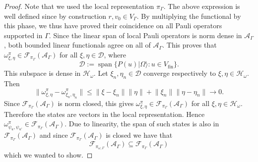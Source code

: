 \documentclass[aps,pra,reprint,superscriptaddress]{revtex4-2}
\newcommand{\cA}{{\mathcal A}}
\newcommand{\cD}{{\mathcal D}}
\newcommand{\cF}{{\mathcal F}}
\newcommand{\cH}{{\mathcal H}}
\newcommand\G{\Gamma}
\newcommand\w{\omega}
\newcommand\W{\Omega}
\newcommand\y{\psi}
\providecommand{\ket}[1]{\lvert #1\rangle}
\providecommand{\norm}[1]{\lVert #1\rVert}
\theoremstyle{definition}
\theoremstyle{remark}
\begin{document}
\begin{proof}
        Note that we used the local representation $\pi_\G$. The above
        expression is well defined since by construction $r,v_0 \in V_\G$.
        By multiplying the functional by this phase, we thus have proved
        their coincidence on all Pauli operators supported in $\G$. 
        Since the linear span of local Pauli operators is norm dense in $\cA_\G$, both bounded linear functionals agree on all of $\cA_\G$. This proves that
        $\w^\pi_{\xi,\eta}\in\cF_{\pi_\G}(\cA_\G)$ for all
        $\xi,\eta\in\cD$, where
        \begin{equation}
            \cD:=\operatorname{span}\{P(u)\ket{\W}:u\in V_{\mathrm{fin}}\}.
        \end{equation}
        This subspace is dense in $\cH_\w$. Let
        $\xi_n,\eta_n\in\cD$ converge respectively to
        $\xi,\eta\in\cH_\w$. Then
        \begin{equation}
            \norm{\w^\pi_{\xi,\eta}-\w^\pi_{\xi_n,\eta_n}}
            \leq
            \norm{\xi-\xi_n}\norm{\eta}
            +
            \norm{\xi_n}\norm{\eta-\eta_n}
            \to 0.
        \end{equation}
        Since $\cF_{\pi_\G}(\cA_\G)$ is norm closed, this gives
        $\w^\pi_{\xi,\eta}\in\cF_{\pi_\G}(\cA_\G)$ for all
        $\xi,\eta\in\cH_\w$.
        Therefore the states are
        vectors in the local representation. Hence
	        $\w^{\pi}_{\y_u,\y_{u'}}\in\cF_{\pi_\G}(\cA_\G)$.
           Due to linearity, the span of such states is also in
           $\cF_{\pi_\G}(\cA_\G)$ and since $\cF_{\pi_\G}(\cA_\G)$ is closed we
           have that
           \begin{equation}
               \cF_{\pi_{\w,\G}}(\cA_\G) \subseteq \cF_{\pi_\G}(\cA_\G)
           \end{equation}
           which we wanted to show.
        \end{proof}
\end{document}
